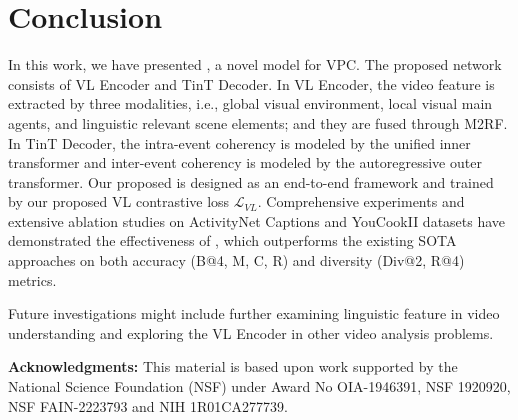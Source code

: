 \documentclass[letterpaper]{article} \usepackage{aaai23}  \usepackage{times}  \usepackage{helvet}  \usepackage{courier}  \usepackage[hyphens]{url}  \usepackage{graphicx} \urlstyle{rm} \def\UrlFont{\rm}  \usepackage{natbib}  \usepackage{caption} \frenchspacing  \setlength{\pdfpagewidth}{8.5in}  \setlength{\pdfpageheight}{11in}  \usepackage{algorithm}
\newcommand{\encoder}{VL Encoder\xspace}
\begin{document}
\begin{table}[t]
\centering
\caption{Computational cost vs. accuracy between VLTinT with different settings and SOTA VPC models.}
\label{tab:complexity}
\end{table}


\section*{Conclusion}
In this work, we have presented \model, a novel model for VPC. The proposed network consists of \encoder and TinT Decoder. In \encoder, the video feature is extracted by three modalities, i.e., global visual environment, local visual main agents, and linguistic relevant scene elements; and they are fused through M2RF. In TinT Decoder, the intra-event coherency is modeled by the unified inner transformer and inter-event coherency is modeled by the autoregressive outer transformer. Our proposed \model is designed as an end-to-end framework and trained by our proposed VL contrastive loss $\mathcal{L}_{VL}$. 
Comprehensive experiments and extensive ablation studies on ActivityNet Captions and YouCookII datasets have demonstrated the effectiveness of \model, which outperforms the existing SOTA approaches on both accuracy (B@4, M, C, R) and diversity (Div@2, R@4) metrics. 


Future investigations might include further examining linguistic feature in video understanding and exploring the VL Encoder in other video analysis problems.


\textbf{Acknowledgments:}
This material is based upon work supported by the National Science Foundation (NSF) under Award No OIA-1946391, NSF 1920920, NSF FAIN-2223793 and NIH 1R01CA277739.

\footnotesize

\end{document}
